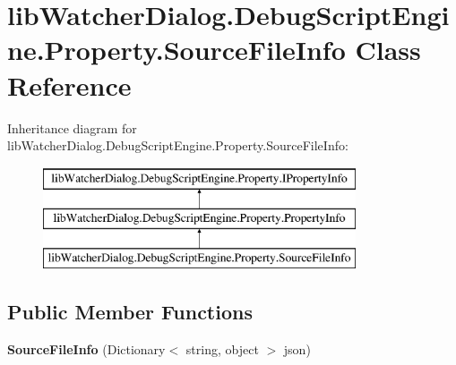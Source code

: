 \hypertarget{classlib_watcher_dialog_1_1_debug_script_engine_1_1_property_1_1_source_file_info}{\section{lib\+Watcher\+Dialog.\+Debug\+Script\+Engine.\+Property.\+Source\+File\+Info Class Reference}
\label{classlib_watcher_dialog_1_1_debug_script_engine_1_1_property_1_1_source_file_info}
}
Inheritance diagram for lib\+Watcher\+Dialog.\+Debug\+Script\+Engine.\+Property.\+Source\+File\+Info\+:\begin{figure}[H]
\begin{center}
\leavevmode
\includegraphics[height=3.000000cm]{classlib_watcher_dialog_1_1_debug_script_engine_1_1_property_1_1_source_file_info}
\end{center}
\end{figure}
\subsection*{Public Member Functions}
\begin{DoxyCompactItemize}
\item 
\hypertarget{classlib_watcher_dialog_1_1_debug_script_engine_1_1_property_1_1_source_file_info_a7c6af335ded68f0df72c146f29d68828}{{\bfseries Source\+File\+Info} (Dictionary$<$ string, object $>$ json)}\label{classlib_watcher_dialog_1_1_debug_script_engine_1_1_property_1_1_source_file_info_a7c6af335ded68f0df72c146f29d68828}

\end{DoxyCompactItemize}
